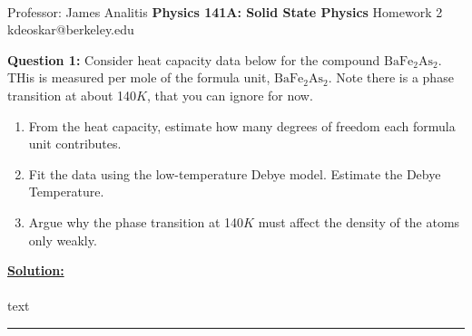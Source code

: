 \documentclass[11pt]{article}
\begin{document}
\thispagestyle{empty}
\bigskip \
\vspace{0.1cm}

\begin{center}
{\fontsize{22}{22} \selectfont Professor: James Analitis}
\vskip 16pt
{\fontsize{30}{30} \selectfont \bf \sffamily Physics 141A: Solid State Physics}
\vskip 24pt
{\fontsize{14}{14} \selectfont \rmfamily Homework 2} 
\vskip 6pt
{\fontsize{14}{14} \selectfont \ttfamily kdeoskar@berkeley.edu} 
\vskip 24pt
\end{center}





\begin{bluebox}
  \textbf{Question 1:} Consider heat capacity data below for the compound $\mathrm{Ba}\mathrm{Fe}_2\mathrm{As}_2$. THis is measured per mole of the formula unit, $\mathrm{Ba}\mathrm{Fe}_2\mathrm{As}_2$. Note there is a phase transition at about 140$K$, that you can ignore for now.
  \begin{enumerate}
    \item From the heat capacity, estimate how many degrees of freedom each formula unit contributes.
    \item Fit the data using the low-temperature Debye model. Estimate the Debye Temperature.
    \item Argue why the phase transition at 140$K$ must affect the density of the atoms only weakly.
  \end{enumerate}
\end{bluebox}

\vskip 0.5cm
\textbf{\underline{Solution:}}
\\
\\
text
\vskip 0.5cm
\hrule
\pagebreak
\end{document}
